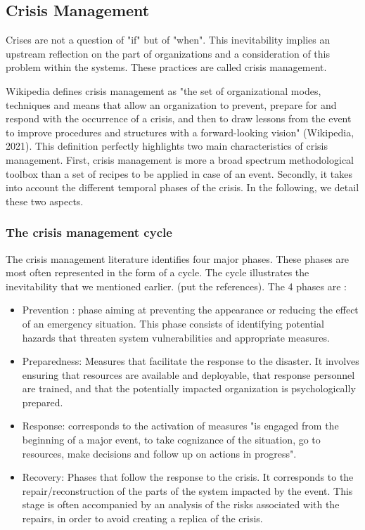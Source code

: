\subsection{Crisis Management}
Crises are not a question of "if" but of "when".
This inevitability implies an upstream reflection on the part of organizations and a consideration of this problem within the systems.
These practices are called crisis management.

Wikipedia defines crisis management as "the set of organizational modes, techniques and means that allow an organization to prevent,
prepare for and respond with the occurrence of a crisis, and then to draw lessons from the event to improve procedures and structures
with a forward-looking vision" (Wikipedia, 2021).
This definition perfectly highlights two main characteristics of crisis management.
First, crisis management is more a broad spectrum methodological toolbox than a set of recipes to be applied in case of an event.
Secondly, it takes into account the different temporal phases of the crisis.
In the following, we detail these two aspects.

\subsubsection{The crisis management cycle}
The crisis management literature identifies four major phases.
These phases are most often represented in the form of a cycle.
The cycle illustrates the inevitability that we mentioned earlier. (put the references).
The 4 phases are :

\begin{itemize}
    \item Prevention : phase aiming at preventing the appearance or reducing the effect of an emergency situation.
          This phase consists of identifying potential hazards that threaten system vulnerabilities and appropriate measures.
    \item Preparedness: Measures that facilitate the response to the disaster. It involves ensuring that resources are available and deployable, that response personnel are trained, and that the potentially impacted organization is psychologically prepared.
    \item Response: corresponds to the activation of measures "is engaged from the beginning of a major event, to take cognizance of the situation, go to resources, make decisions
          and follow up on actions in progress".
    \item Recovery: Phases that follow the response to the crisis. It corresponds to the repair/reconstruction of the parts of the system impacted by the event.
          This stage is often accompanied by an analysis of the risks associated with the repairs, in order to avoid creating a replica of the crisis.
\end{itemize}

